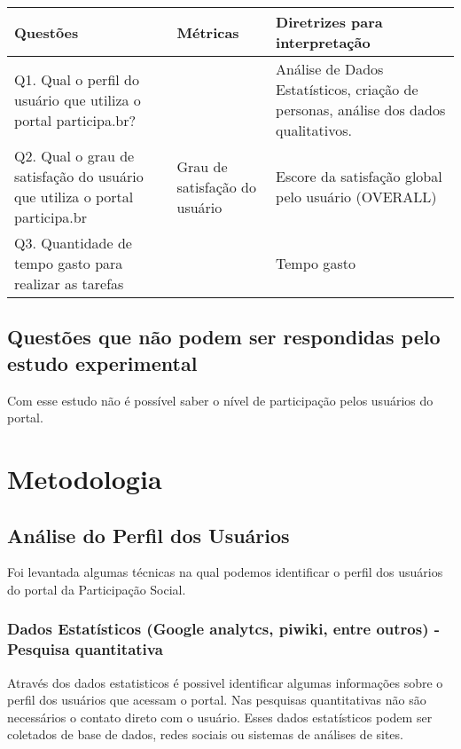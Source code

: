 \begin{table}[h]
\begin{tabular}{| p{15cm} |l|l|}
\hline
\textbf{Questões}                                                          & Métricas                      & Diretrizes para interpretação                                                       \\ \hline
Q1. Qual o perfil do usuário que utiliza o portal participa.br?            &                               & Análise de Dados Estatísticos, criação de personas, análise dos dados qualitativos. \\ \hline
Q2. Qual o grau de satisfação do usuário que utiliza o portal participa.br & Grau de satisfação do usuário & Escore da satisfação global pelo usuário (OVERALL)                                  \\ \hline
Q3. Quantidade de tempo gasto para realizar as tarefas      &                               & Tempo gasto                       \\ \hline
\end{tabular}
\end{table}


\subsection{Questões que não podem ser respondidas pelo estudo experimental}

Com esse estudo não é possível saber o nível de participação pelos usuários do portal.

\section{Metodologia}

\subsection{Análise do Perfil dos Usuários}

	Foi levantada algumas técnicas na qual podemos identificar o perfil dos usuários do portal da Participação Social.

\subsubsection{Dados Estatísticos (Google analytcs, piwiki, entre outros) - Pesquisa quantitativa}

	Através dos dados estatisticos é possivel identificar algumas informações sobre o perfil dos usuários que acessam o portal. Nas pesquisas quantitativas não são necessários o contato direto com o usuário. Esses dados estatísticos podem ser coletados de base de dados, redes sociais ou sistemas de análises de sites.

